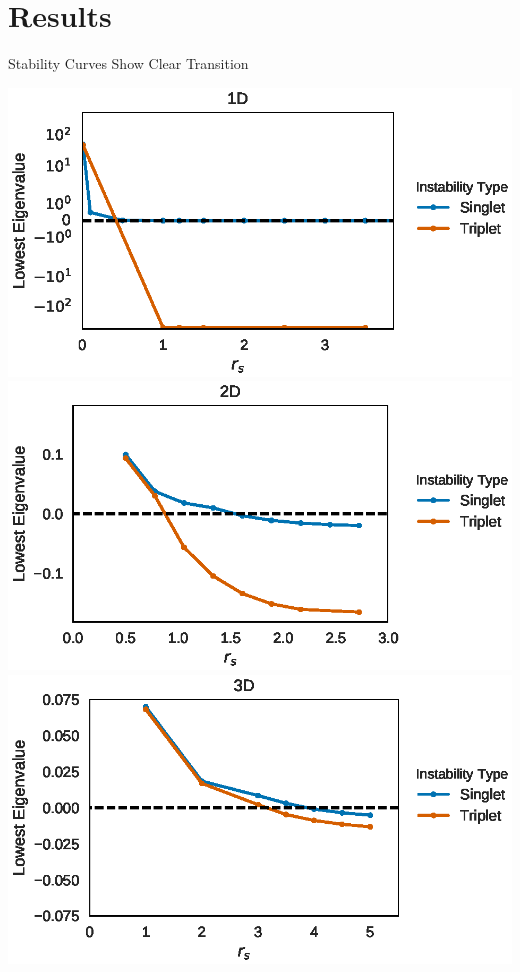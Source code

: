 \documentclass[10pt]{beamer}
\begin{document}
{{{{{{{{{{{\section{Results}
{%
\begin{frame}{Stability Curves Show Clear Transition}
  \begin{overprint}
    \centering
    \centering \vspace{5mm}\includegraphics[width=\linewidth]{../figures/stability1d.eps}
  	\onslide<2>\centering \vspace{5mm}\includegraphics[width=\linewidth]{../figures/stability2d.eps}
  	\onslide<3>\centering \vspace{5mm}\includegraphics[width=\linewidth]{../figures/stability3d.eps}
	\end{overprint}
\end{frame}

}}}}}}}}}}}}
\end{document}
